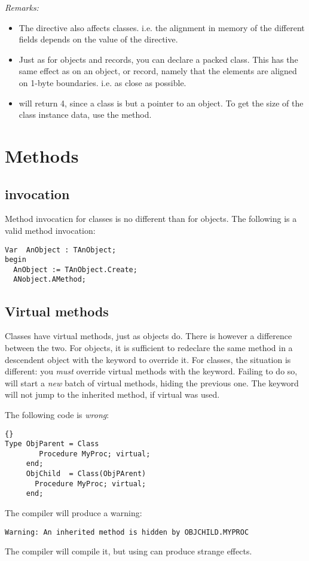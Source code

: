 \documentclass{report}
\begin{document}
{\em Remarks:}
\begin{itemize}
\item The  directive also affects classes.
i.e. the alignment in memory of the different fields depends on the
value of  the  directive.
\item Just as for objects and records, you can declare a packed class.
This has the same effect as on an object, or record, namely that the
elements are aligned on 1-byte boundaries. i.e. as close as possible.
\item {} will return 4, since a class is but a pointer to
an object. To get the size of the class instance data, use the
 method.
\end{itemize}

\section{Methods}
\subsection{invocation}
Method invocaticn for classes is no different than for objects. The
following is a valid method invocation:
\begin{verbatim}
Var  AnObject : TAnObject;
begin
  AnObject := TAnObject.Create;
  ANobject.AMethod;
\end{verbatim}
\subsection{Virtual methods}
Classes have virtual methods, just as objects do. There is however a
difference between the two. For objects, it is sufficient to redeclare the
same method in a descendent object with the keyword  to
override it. For classes, the situation is different: you {\em must}
override virtual methods with the  keyword. Failing to do so,
will start a {\em new} batch of virtual methods, hiding the previous
one.  The  keyword will not jump to the inherited method, if
virtual was used. 

The following code is {\em wrong}:
\begin{lstlisting}{}
Type ObjParent = Class
        Procedure MyProc; virtual;
     end;
     ObjChild  = Class(ObjPArent)
       Procedure MyProc; virtual;
     end;
\end{lstlisting}{}     
The compiler will produce a warning:
\begin{verbatim}
Warning: An inherited method is hidden by OBJCHILD.MYPROC
\end{verbatim}
The compiler will compile it, but using  can
produce strange effects.
\end{document}
